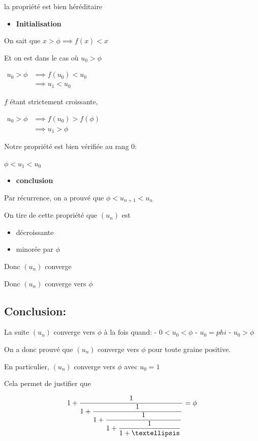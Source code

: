 \documentclass[]{scrartcl}
\providecommand{\tightlist}{%
  \setlength{\itemsep}{0pt}\setlength{\parskip}{0pt}}
\begin{document}
la propriété est bien héréditaire

\begin{itemize}
\tightlist
\item
  \textbf{Initialisation}
\end{itemize}

On sait que \(x > \phi \implies f(x) < x\)

Et on est dans le cas où \(u_0 > \phi\)

\(\begin{array}{cl} u_0 > \phi &\implies f(u_0) < u_0\\[2ex] &\implies u_1 < u_0 \end{array}\)

\(f\) étant strictement croissante,

\(\begin{array}{cl} u_0 > \phi &\implies f(u_0) > f(\phi)\\[2ex] &\implies u_1 > \phi \end{array}\)

Notre propriété est bien vérifiée au rang 0:

\(\phi < u_1 < u_0\)

\vspace*{2cm}{}

\begin{itemize}
\tightlist
\item
  \textbf{conclusion}
\end{itemize}

Par récurrence, on a prouvé que \(\phi < u_{n+1} < u_n\)

On tire de cette propriété que \((u_n)\) est

\begin{itemize}
\tightlist
\item
  décroissante
\item
  minorée par \(\phi\)
\end{itemize}

Donc \((u_n)\) converge

Donc \((u_n)\) converge vers \(\phi\)

\vspace*{2cm}{}
\vspace*{2cm}{}

\hypertarget{conclusion}{%
\subsection{Conclusion:}\label{conclusion}}

La suite \((u_n)\) converge vers \(\phi\) à la fois quand: -
\(0 < u_0 < \phi\) - \(u_0 = phi\) - \(u_0 > \phi\)

On a donc prouvé que \((u_n)\) converge vers \(\phi\) pour toute graine
positive.

En particulier, \((u_n)\) converge vers \(\phi\) avec \(u_0 = 1\)

Cela permet de justifier que

\[
1 + \dfrac{1}{1 + \dfrac{1}{1 + \dfrac{1}{1 + \dfrac{1}{1 + …}}}} = \large \phi
\]

\label{LastPage}
\end{document}
